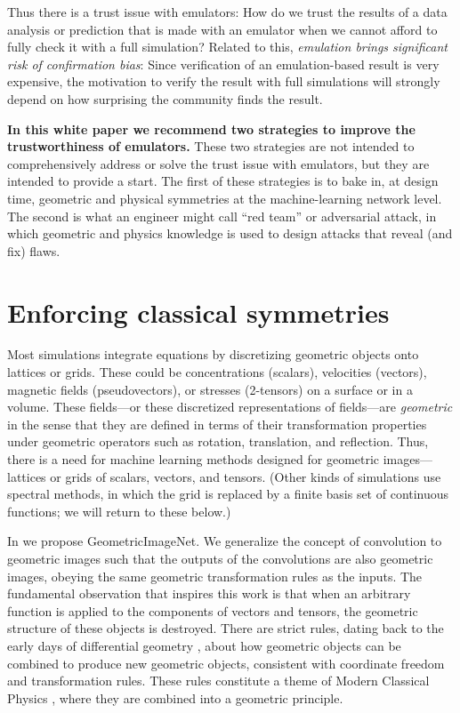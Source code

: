 \documentclass[11pt]{article}
\begin{document}
Thus there is a trust issue with emulators:
How do we trust the results of a data analysis or prediction that is made with an emulator when we cannot afford to fully check it with a full simulation?
Related to this, \emph{emulation brings significant risk of confirmation bias}:
Since verification of an emulation-based result is very expensive, the motivation to verify the result with full simulations will strongly depend on how surprising the community finds the result. %

\textbf{In this white paper we recommend two strategies to improve the trustworthiness of emulators.}
These two strategies are not intended to comprehensively address or solve the trust issue with emulators, but they are intended to provide a start.
The first of these strategies is to bake in, at design time, geometric and physical symmetries at the machine-learning network level.
The second is what an engineer might call ``red team'' or adversarial attack, in which geometric and physics knowledge is used to design attacks that reveal (and fix) flaws.

\section{Enforcing classical symmetries}

Most simulations integrate equations by discretizing geometric objects onto lattices or grids.
These could be concentrations (scalars), velocities (vectors), magnetic fields (pseudovectors), or stresses (2-tensors) on a surface or in a volume.
These fields---or these discretized representations of fields---are \emph{geometric} in the sense that they are defined in terms of their transformation properties under geometric operators such as rotation, translation, and reflection.
Thus, there is a need for machine learning methods designed for geometric images—lattices or grids of scalars, vectors, and tensors.
(Other kinds of simulations use spectral methods, in which the grid is replaced by a finite basis set of continuous functions; we will return to these below.)

In \cite{gregory2023geometricimagenet} we propose GeometricImageNet. We generalize the concept of convolution to geometric images such that the outputs of the convolutions are also geometric images, obeying the same geometric transformation rules as the inputs.
The fundamental observation that inspires this work is that when an arbitrary function is applied to the components of vectors and tensors, the geometric structure of these objects is destroyed. There are strict rules, dating back to the early days
of differential geometry \cite{ricci}, about how geometric objects can be combined to produce new geometric objects, consistent with coordinate freedom and transformation rules. These rules constitute a theme of Modern Classical Physics \cite{mcp}, where they are combined into a geometric principle. 
\end{document}
